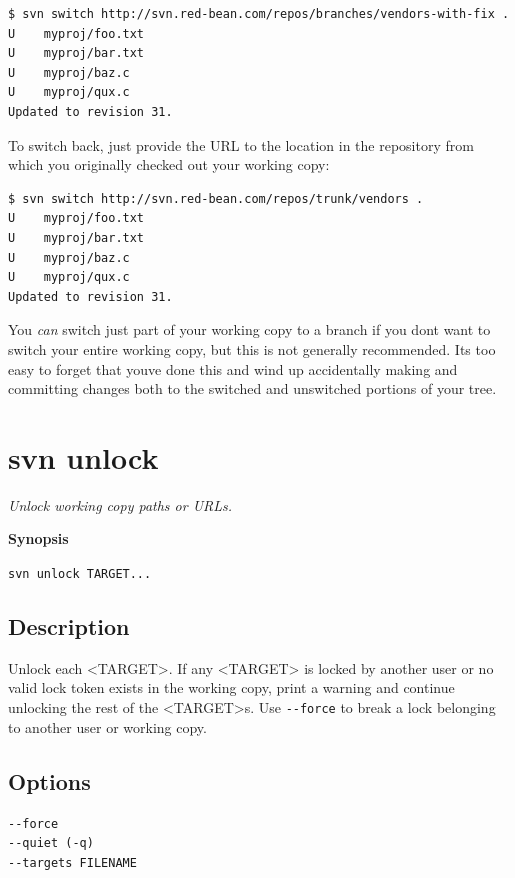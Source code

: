 \begin{verbatim}
$ svn switch http://svn.red-bean.com/repos/branches/vendors-with-fix .
U    myproj/foo.txt
U    myproj/bar.txt
U    myproj/baz.c
U    myproj/qux.c
Updated to revision 31.
\end{verbatim}

To switch back, just provide the URL to the location in the repository
from which you originally checked out your working copy:

\begin{verbatim}
$ svn switch http://svn.red-bean.com/repos/trunk/vendors .
U    myproj/foo.txt
U    myproj/bar.txt
U    myproj/baz.c
U    myproj/qux.c
Updated to revision 31.
\end{verbatim}

You \emph{can} switch just part of your working copy to a branch if you
don\textquotesingle t want to switch your entire working copy, but this
is not generally recommended. It\textquotesingle s too easy to forget
that you\textquotesingle ve done this and wind up accidentally making
and committing changes both to the switched and unswitched portions of
your tree.

\section{svn unlock}\label{svn.ref.svn.c.unlock}

\emph{Unlock working copy paths or URLs.}

\textbf{Synopsis}

\texttt{svn\ unlock\ TARGET...}

\subsection{Description}

Unlock each \textless TARGET\textgreater. If any
\textless TARGET\textgreater{} is locked by another user or no valid
lock token exists in the working copy, print a warning and continue
unlocking the rest of the \textless TARGET\textgreater s. Use
\texttt{-\/-force} to break a lock belonging to another user or working
copy.

\subsection{Options}

\begin{verbatim}
--force
--quiet (-q)
--targets FILENAME
\end{verbatim}

